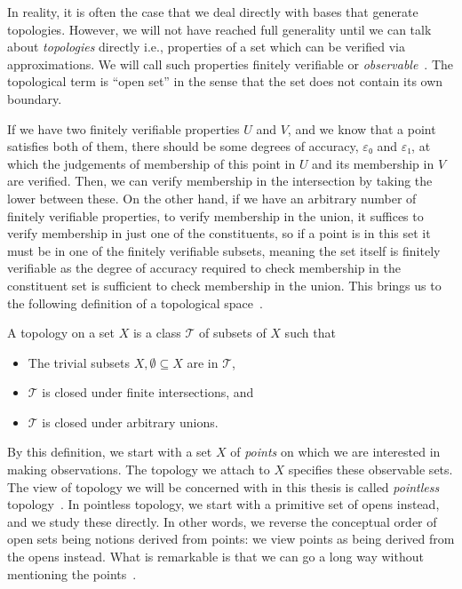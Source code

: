 In reality, it is often the case that we deal directly with bases that generate
topologies. However, we will not have reached full generality until we can talk about
\emph{topologies} directly i.e., properties of a set which can be verified via
approximations. We will call such properties finitely verifiable or
\emph{observable}~\cite{abramsky-thesis}. The topological term is ``open set'' in the
sense that the set does not contain its own boundary.

If we have two finitely verifiable properties $U$ and $V$, and we know that a point
satisfies both of them, there should be some degrees of accuracy, $ε₀$ and $ε₁$, at which
the judgements of membership of this point in $U$ and its membership in $V$ are verified.
Then, we can verify membership in the intersection by taking the lower between these. On
the other hand, if we have an arbitrary number of finitely verifiable properties, to
verify membership in the union, it suffices to verify membership in just one of the
constituents, so if a point is in this set it must be in one of the finitely verifiable
subsets, meaning the set itself is finitely verifiable as the degree of accuracy required
to check membership in the constituent set is sufficient to check membership in the union.
This brings us to the following definition of a topological space~\cite{munkres}.
\begin{defn}\label{defn:topospace}
  A topology on a set $X$ is a class $\mathcal{T}$ of subsets of $X$ such that
  \begin{itemize}
    \item The trivial subsets $X, \emptyset \subseteq X$ are in $\mathcal{T}$,
    \item $\mathcal{T}$ is closed under finite intersections, and
    \item $\mathcal{T}$ is closed under arbitrary unions.
  \end{itemize}
\end{defn}

By this definition, we start with a set $X$ of \emph{points} on which we are interested in
making observations. The topology we attach to $X$ specifies these observable sets. The
view of topology we will be concerned with in this thesis is called \emph{pointless}
topology~\cite{johnstone-the-point}. In pointless topology, we start with a primitive set
of opens instead, and we study these directly. In other words, we reverse the conceptual
order of open sets being notions derived from points: we view points as being derived from
the opens instead. What is remarkable is that we can go a long way without mentioning the
points~\cite{johnstone-the-point}.

